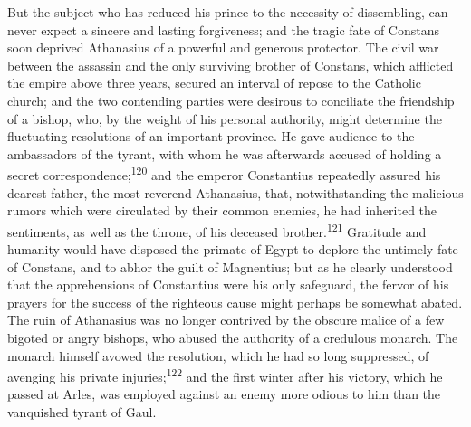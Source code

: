 But the subject who has reduced his prince to the necessity of
dissembling, can never expect a sincere and lasting forgiveness;
and the tragic fate of Constans soon deprived Athanasius of a
powerful and generous protector. The civil war between the
assassin and the only surviving brother of Constans, which
afflicted the empire above three years, secured an interval of
repose to the Catholic church; and the two contending parties
were desirous to conciliate the friendship of a bishop, who, by
the weight of his personal authority, might determine the
fluctuating resolutions of an important province. He gave
audience to the ambassadors of the tyrant, with whom he was
afterwards accused of holding a secret correspondence;\textsuperscript{120} and
the emperor Constantius repeatedly assured his dearest father,
the most reverend Athanasius, that, notwithstanding the malicious
rumors which were circulated by their common enemies, he had
inherited the sentiments, as well as the throne, of his deceased
brother.\textsuperscript{121} Gratitude and humanity would have disposed the
primate of Egypt to deplore the untimely fate of Constans, and to
abhor the guilt of Magnentius; but as he clearly understood that
the apprehensions of Constantius were his only safeguard, the
fervor of his prayers for the success of the righteous cause
might perhaps be somewhat abated. The ruin of Athanasius was no
longer contrived by the obscure malice of a few bigoted or angry
bishops, who abused the authority of a credulous monarch. The
monarch himself avowed the resolution, which he had so long
suppressed, of avenging his private injuries;\textsuperscript{122} and the first
winter after his victory, which he passed at Arles, was employed
against an enemy more odious to him than the vanquished tyrant of
Gaul.




